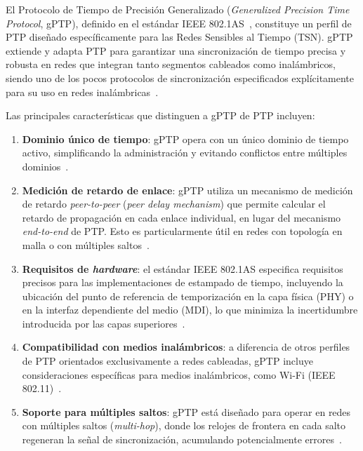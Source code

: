 El Protocolo de Tiempo de Precisión Generalizado (\textit{Generalized Precision Time Protocol}, gPTP), definido en el estándar IEEE 802.1AS~\cite{ieee8021as_2020}, constituye un perfil de PTP diseñado específicamente para las Redes Sensibles al Tiempo (TSN). gPTP extiende y adapta PTP para garantizar una sincronización de tiempo precisa y robusta en redes que integran tanto segmentos cableados como inalámbricos, siendo uno de los pocos protocolos de sincronización especificados explícitamente para su uso en redes inalámbricas~\cite{ieee8021as_2020}.

Las principales características que distinguen a gPTP de PTP incluyen:

\begin{enumerate}
\item \textbf{Dominio único de tiempo}: gPTP opera con un único dominio de tiempo activo, simplificando la administración y evitando conflictos entre múltiples dominios~\cite{ieee8021as_2020}.

\item \textbf{Medición de retardo de enlace}: gPTP utiliza un mecanismo de medición de retardo \textit{peer-to-peer} (\textit{peer delay mechanism}) que permite calcular el retardo de propagación en cada enlace individual, en lugar del mecanismo \textit{end-to-end} de PTP. Esto es particularmente útil en redes con topología en malla o con múltiples saltos~\cite{stanton2018}.

\item \textbf{Requisitos de \textit{hardware}}: el estándar IEEE 802.1AS especifica requisitos precisos para las implementaciones de estampado de tiempo, incluyendo la ubicación del punto de referencia de temporización en la capa física (PHY) o en la interfaz dependiente del medio (MDI), lo que minimiza la incertidumbre introducida por las capas superiores~\cite{ieee8021as_2020}.

\item \textbf{Compatibilidad con medios inalámbricos}: a diferencia de otros perfiles de PTP orientados exclusivamente a redes cableadas, gPTP incluye consideraciones específicas para medios inalámbricos, como Wi-Fi (IEEE 802.11)~\cite{ieee8021as_2020,mahmood2017}.

\item \textbf{Soporte para múltiples saltos}: gPTP está diseñado para operar en redes con múltiples saltos (\textit{multi-hop}), donde los relojes de frontera en cada salto regeneran la señal de sincronización, acumulando potencialmente errores~\cite{stanton2018}.
\end{enumerate}

